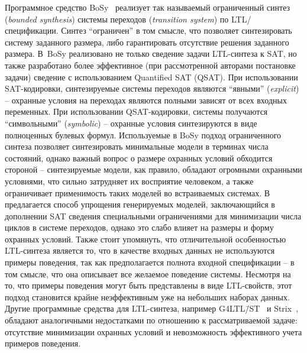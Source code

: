 Программное средство BoSy~\cite{bosy,not-bosy} реализует так называемый ограниченный синтез (\textit{bounded synthesis}) системы переходов (\textit{transition system}) по LTL\-/спецификации.
Синтез \enquote{ограничен} в том смысле, что позволяет синтезировать систему заданного размера, либо гарантировать отсутствие решения заданного размера.
В~BoSy реализовано не только сведение задачи LTL-синтеза к SAT, но также разработано более эффективное (при рассмотренной авторами постановке задачи) сведение с использованием Quantified SAT (QSAT).
При использовании SAT-кодировки, синтезируемые системы переходов являются \enquote{явными} (\textit{explicit}) \--- охранные условия на переходах являются полными зависят от всех входных переменных.
При использовании QSAT-кодировки, системы получаются \enquote{символьными} (\textit{symbolic}) \--- охранные условия синтезируются в виде полноценных булевых формул.
Используемые в BoSy подход ограниченного синтеза позволяет синтезировать минимальные модели в терминах числа состояний, однако важный вопрос о размере охранных условий обходится стороной \--- синтезируемые модели, как правило, обладают огромными охранными условиями, что сильно затрудняет их восприятие человеком, а также ограничивает применимость таких моделей во встраиваемых системах.
В~\cite{bounded-cycle} предлагается способ упрощения генерируемых моделей, заключающийся в дополнении SAT сведения специальными ограничениями для минимизации числа циклов в системе переходов, однако это слабо влияет на размеры и форму охранных условий.
Также стоит упомянуть, что отличительной особенностью LTL-синтеза является то, что в качестве входных данных не используются примеры поведения, так как предполагается полнота входной спецификации \--- в том смысле, что она описывает все желаемое поведение системы.
Несмотря на то, что примеры поведения могут быть представлены в виде LTL-свойств, этот подход становится крайне неэффективным уже на небольших наборах данных.
Другие программные средства для LTL-синтеза, например G4LTL\=/ST~\cite{g4ltl-st} и Strix~\cite{strix}, обладают аналогичными недостатками по отношению к рассматриваемой задаче: отсутствие минимизации охранных условий и невозможность эффективного учета примеров поведения.

